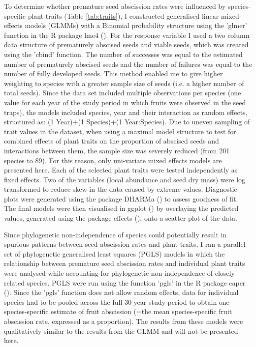 To determine whether premature seed abscission rates were influenced by species-specific plant traits (Table \ref{tab:traits}), I constructed generalised linear mixed-effects models (GLMMs) with a Binomial probability structure using the 'glmer' function in the R package lme4 (\cite{batesLme4LinearMixedEffects2020}). For the response variable I used a two column data structure of prematurely abscised seeds and viable seeds, which was created using the 'cbind' function. The number of successes was equal to the estimated number of prematurely abscised seeds and the number of failures was equal to the number of fully developed seeds. This method enabled me to give higher weighting to species with a greater sample size of seeds (i.e. a higher number of total seeds). Since the data set included multiple observations per species (one value for each year of the study period in which fruits were observed in the seed traps), the models included species, year and their interaction as random effects, structured as: (1 \textbar Year)+(1 \textbar Species)+(1 \textbar Year:Species). Due to uneven sampling of trait values in the dataset, when using a maximal model structure to test for combined effects of plant traits on the proportion of abscised seeds and interactions between them, the sample size was severely reduced (from 201 species to 89). For this reason, only uni-variate mixed effects models are presented here. Each of the selected plant traits were tested independently as fixed effects. Two of the variables (local abundance and seed dry mass) were log transformed to reduce skew in the data caused by extreme values. Diagnostic plots were generated using the package DHARMa (\cite{hartigDHARMaResidualDiagnostics2020}) to assess goodness of fit. The final models were then visualised in ggplot (\cite{wickhamGgplot2CreateElegant2020}) by overlaying the predicted values, generated using the package effects (\cite{foxEffectsEffectDisplays2019}), onto a scatter plot of the data.

Since phylogenetic non-independence of species could potentially result in spurious patterns between seed abscission rates and plant traits, I ran a parallel set of phylogenetic generalised least squares (PGLS) models in which the relationship between premature seed abscission rates and individual plant traits were analysed while accounting for phylogenetic non-independence of closely related species. PGLS were run using the function 'pgls' in the R package caper (\cite{ormeCaperComparativeAnalyses2018}). Since the 'pgls' function does not allow random effects, data for individual species had to be pooled across the full 30-year study period to obtain one species-specific estimate of fruit abscission (=the mean species-specific fruit abscission rate, expressed as a proportion). The results from these models were qualitatively similar to the results from the GLMM and will not be presented here.

